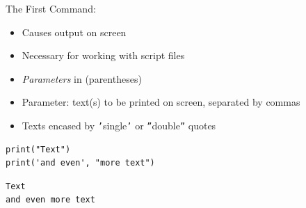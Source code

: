 
\begin{frame}[fragile]{The First Command: }
%
\begin{itemize}
\item Causes output on screen
\item Necessary for working with script files
\item \emph{Parameters} in (parentheses)
\item Parameter: text(s) to be printed on screen, separated by commas
\item Texts encased by \texttt{'}single\texttt{'} or \texttt{''}double\texttt{''} quotes
\end{itemize}

\vspace{10pt}
\begin{minipage}{.49\linewidth}
\begin{codebox}
\begin{verbatim}
print("Text")
print('and even', "more text")
\end{verbatim}
\end{codebox}
%
\end{minipage}
\begin{minipage}{.49\linewidth}
\begin{cmdbox}
\begin{verbatim}
Text
and even more text
\end{verbatim}
\end{cmdbox}
\end{minipage}
\end{frame}



